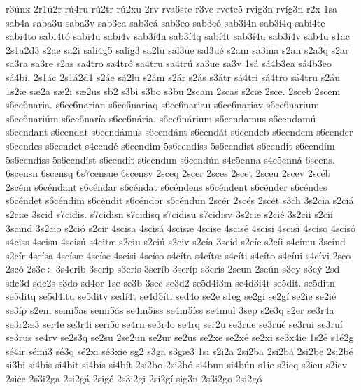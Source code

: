 {r3^^fanx
2r1^^fa2r
r^^fa4ru
r^^fa2tr
r^^fa2xu
2rv
rva6ste
r3ve
rvete5
rvig3n
rv^^edg3n
r2x
1sa
sab4a
saba3u
saba3v
sab3ea
sab3e^^e1
sab3eo
sab3e^^f3
sab3i4n
sab3i4q
sabi4te
sabi4to
sabi4t^^f3
sabi4u
sabi4v
sab3^^ed4n
sab3^^ed4q
sab^^ed4t
sab3^^ed4u
sab3^^ed4v
sab4u
s1ac
2s1a2d3
s2ae
sa2i
sali4g5
sal^^edg3
sa2lu
sal3ue
sal3u^^e9
s2am
sa3ma
s2an
s2a3q
s2ar
sa3ra
sa3re
s2as
sa4tro
sa4tr^^f3
sa4tru
sa4tr^^fa
sa3ue
sa3v
1s^^e1
s^^e14b3ea
s^^e14b3eo
s^^e14bi.
2s1^^e1c
2s1^^e12d1
s2^^e1e
s^^e12lu
s2^^e1m
s2^^e1r
s2^^e1s
s3^^e1tr
s^^e14tri
s^^e14tro
s^^e14tru
s2^^e1u
1s2^^e6
s^^e62a
s^^e62i
s^^e62us
sb2
s3bi
s3bo
s3bu
2scam
2scas
s2c^^e6
2sce.
2sceb
2scem
s6ce6naria.
s6ce6narian
s6ce6nariaq
s6ce6nariau
s6ce6nariav
s6ce6narium
s6ce6nari^^fam
s6ce6nar^^eda
s6ce6n^^e1ria.
s6ce6n^^e1rium
s6cendamus
s6cendam^^fa
s6cendant
s6cendat
s6cend^^e1mus
s6cend^^e1nt
s6cend^^e1t
s6cendeb
s6cendem
s6cender
s6cendes
s6cendet
s4cend^^e9
s6cendim
5s6cendiss
5s6cendist
s6cendit
s6cend^^edm
5s6cend^^edss
5s6cend^^edst
s6cend^^edt
s6cendun
s6cend^^fan
s4c5enna
s4c5enn^^e1
6scens.
6scensn
6scensq
6s7censue
6scensv
2sceq
2scer
2sces
2scet
2sceu
2scev
2sc^^e9b
2sc^^e9m
s6c^^e9ndant
s6c^^e9ndar
s6c^^e9ndat
s6c^^e9ndens
s6c^^e9ndent
s6c^^e9nder
s6c^^e9ndes
s6c^^e9ndet
s6c^^e9ndim
s6c^^e9ndit
s6c^^e9ndor
s6c^^e9ndun
2sc^^e9r
2sc^^e9s
2sc^^e9t
s3ch
3s2cia
s2ci^^e1
s2ci^^e6
3scid
s7cidis.
s7cidisn
s7cidisq
s7cidisu
s7cidisv
3s2cie
s2ci^^e9
3s2cii
s2ci^^ed
3scind
3s2cio
s2ci^^f3
s2cir
4scisa
4scis^^e1
4scis^^e6
4scise
4scis^^e9
4scisi
4scis^^ed
4sciso
4scis^^f3
s4ciss
4scisu
4scis^^fa
s4cit^^e6
s2ciu
s2ci^^fa
s2civ
s2c^^eda
3sc^^edd
s2c^^ede
s2c^^edi
s4c^^edmu
3sc^^ednd
s2c^^edr
4sc^^edsa
4sc^^eds^^e6
4sc^^edse
4sc^^edsi
4sc^^edso
s4c^^edta
s4c^^edt^^e6
s4c^^edti
s4c^^edto
s4c^^edui
s4c^^edvi
2sco
2sc^^f3
2s3c^^f7
3s4crib
3scrip
s3cris
3scr^^edb
3scr^^edp
s3cr^^eds
2scun
2sc^^fan
s3cy
s3c^^fd
2sd
sde3d
sde2s
s3do
sd4or
1se
se3b
3sec
se3d2
se5d4i3m
se4d3i4t
se5dit.
se5ditn
se5ditq
se5d4itu
se5ditv
sed^^ed4t
se4d5^^edti
sed4o
se2e
s1eg
se2gi
se2g^^ed
se2ie
se2i^^e9
se3^^edp
s2em
semi5as
semi5^^e1s
se4m5iss
se4m5^^edss
se4mul
3sep
s2e3q
s2er
se3r4a
se3r2^^e63
ser4e
se3r4i
seri5c
se4rn
se3r4o
se4rq
ser2u
se3rue
se3ru^^e9
se3rui
se3ru^^ed
se3rus
se4rv
se2s3q
se2su
2se2un
se2ur
se2us
se2xe
se2x^^e9
se2xi
se3x4ie
1s2^^e9
s1^^e92g
s^^e94ir
s^^e9mi3
s^^e93q
s^^e92xi
s^^e93xie
sg2
s3ga
s3g^^e63
1si
s2i2a
2si2ba
2si2b^^e1
2si2be
2si2b^^e9
si3bi
si4bis
si4bit
si4b^^eds
si4b^^edt
2si2bo
2si2b^^f3
si4bun
si4b^^fan
s1ie
s2ieq
s2ieu
s2iev
2si^^e9c
2s3i2ga
2si2g^^e1
2sig^^e9
2s3i2gi
2si2g^^ed
sig3n
2s3i2go
2si2g^^f3
}
